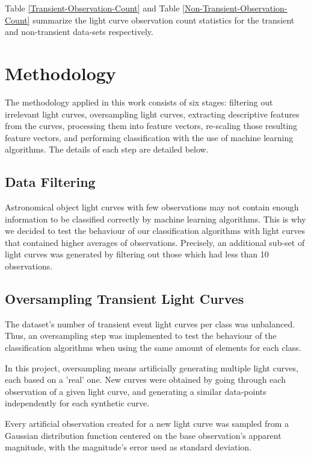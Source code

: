 \documentclass[a4paper,fleqn,usenatbib]{mnras}
\begin{document}
Table \ref{Transient-Observation-Count} and Table \ref{Non-Transient-Observation-Count} summarize the light curve observation count statistics for the transient and non-transient data-sets respectively.

\section{Methodology} 
\label{section_method}
The methodology applied in this work consists of six stages: filtering out irrelevant light curves, oversampling light curves, extracting descriptive features from the curves, processing them into feature vectors, re-scaling those resulting feature vectors, and performing classification with the use of machine learning algorithms. The details of each step are detailed below.

\subsection{Data Filtering} 
\label{subsection_filtering}

Astronomical object light curves with few observations may not contain enough information to be classified correctly by machine learning algorithms. 
This is why we decided to test the behaviour of our classification algorithms with light curves that contained higher averages of observations. Precisely, an additional sub-set of light curves was generated by filtering out those which had less than 10 observations.


\subsection{Oversampling Transient Light Curves} \label{subsection_oversampling}

The dataset's number of transient event light curves per class was unbalanced. Thus, an oversampling step was implemented to test the behaviour of the classification algorithms when using the same amount of elements for each class.

In this project, oversampling means artificially generating multiple light curves, each based on a 'real' one. New curves were obtained by going through each observation of a given light curve, and generating a similar data-points independently for each synthetic curve.

Every artificial observation created for a new light curve was sampled from a Gaussian distribution function centered on the base observation's apparent magnitude, with the magnitude's error used as standard deviation.
\end{document}
